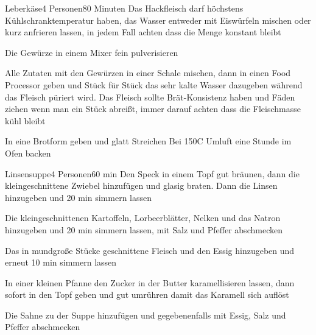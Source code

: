 
\begin{recipe}{Leberkäse}{4 Personen}{80 Minuten}
\ing[Info]{}{}
Das Hackfleisch darf höchstens Kühlschranktemperatur haben, das Wasser entweder mit Eiswürfeln mischen oder kurz anfrieren lassen, in jedem Fall achten dass die Menge konstant bleibt

Die Gewürze in einem Mixer fein pulverisieren

Alle Zutaten mit den Gewürzen in einer Schale mischen, dann in einen Food Processor geben und Stück für Stück das sehr kalte Wasser dazugeben während das Fleisch püriert wird.
Das Fleisch sollte Brät-Konsistenz haben und Fäden ziehen wenn man ein Stück abreißt, immer darauf achten dass die Fleischmasse kühl bleibt

\ing[]{}{}
In eine Brotform geben und glatt Streichen
Bei 150\0C Umluft eine Stunde im Ofen backen
\end{recipe}


\begin{recipe}{Linsensuppe}{4 Personen}{60 min}
Den Speck in einem Topf gut bräunen, dann die kleingeschnittene Zwiebel hinzufügen und glasig braten. Dann die Linsen hinzugeben und 20 min simmern lassen

Die kleingeschnittenen Kartoffeln, Lorbeerblätter, Nelken und das Natron   hinzugeben und 20 min simmern lassen, mit Salz und Pfeffer abschmecken

Das in mundgroße Stücke geschnittene Fleisch und den Essig hinzugeben und erneut 10 min simmern lassen

In einer kleinen Pfanne den Zucker in der Butter karamellisieren lassen, dann sofort in den Topf geben und gut umrühren damit das Karamell sich auflöst

Die Sahne zu der Suppe hinzufügen und gegebenenfalls mit Essig, Salz und Pfeffer abschmecken
\end{recipe}


